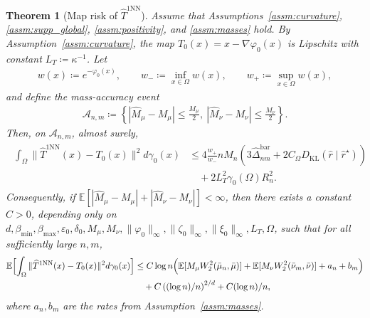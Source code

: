 \documentclass[10pt,a4paper]{amsart}
\newtheorem{theorem}{Theorem}
\newcommand{\Ep}{\mathbb{E}}
\newcommand{\KL}{\mathrm{KL}}
\renewcommand{\epsilon}{\varepsilon}
\renewcommand{\hat}{\widehat}
\begin{document}
\begin{theorem}[Map risk of $\hat T^{1\mathrm{NN}}$]
\label{thm:uot_complete_1nn_estimated_mass}
Assume that Assumptions~\ref{assm:curvature}, \ref{assm:supp_global}, \ref{assm:positivity}, and \ref{assm:masses} hold.
By Assumption~\ref{assm:curvature}, the map $T_0(x) = x - \nabla \varphi_0(x)$ is Lipschitz with constant $L_T \coloneqq \kappa^{-1}$.
Let
\begin{align}
    w(x)\coloneqq e^{-\varphi_0(x)},
    \qquad
    w_- \coloneqq \inf_{x\in\Omega} w(x),
    \qquad
    w_+ \coloneqq \sup_{x\in\Omega} w(x),
\end{align}
and define the mass-accuracy event
\begin{align}
    \mathcal{A}_{n,m}
    \coloneqq
    \left\{
        |\hat M_\mu-M_\mu|\le \frac{M_\mu}{2},
        \ |\hat M_\nu-M_\nu|\le \frac{M_\nu}{2}
    \right\}.
\end{align}
Then, on $\mathcal{A}_{n,m}$, almost surely,
\begin{align}
\label{eq:uot_complete_1nn_estimated_mass_as}
\begin{aligned}
    \int_\Omega \|\hat T^{\mathrm{1NN}}(x)-T_0(x)\|^2  d\gamma_0(x)
    &\le
    4\frac{w_+}{w_-}  n M_n
    \left(
        3\hat\Delta_{nm}^{\mathrm{bar}}
        + 2C_\Omega {D_\KL}(\hat r\mid \hat r^\star)
    \right) \\
    &\quad + 2L_T^2\gamma_0(\Omega)R_n^2.
\end{aligned}
\end{align}
Consequently, if
\(
\Ep[|\hat M_\mu-M_\mu|+|\hat M_\nu-M_\nu|]<\infty
\),
then there exists a constant $C>0$, depending only on
\(
d,\beta_{\min},\beta_{\max},\epsilon_0,\delta_0,M_\mu,M_\nu,\|\varphi_0\|_\infty,\|\zeta_0\|_\infty,\|\xi_0\|_\infty,L_T,\Omega
\),
such that for all sufficiently large $n,m$,
\begin{align}
\label{eq:uot_complete_1nn_estimated_mass_expectation}
\begin{aligned}
    \Ep\Bigl[
        \int_\Omega \|\hat T^{\mathrm{1NN}}(x)-T_0(x)\|^2  d\gamma_0(x)
    \Bigr]
    &\le
    C \log n
    \Bigl(
        \Ep[M_\mu W_2^2(\bar\mu_n,\bar\mu)]
        +
        \Ep[M_\nu W_2^2(\bar\nu_m,\bar\nu)]
        + a_n + b_m
    \Bigr) \\
    &\quad
    + C\left({(\log n)/n}\right)^{2/d}
    + C{(\log n)/n},
\end{aligned}
\end{align}
where $a_n,b_m$ are the rates from Assumption~\ref{assm:masses}.
\end{theorem}
\end{document}
